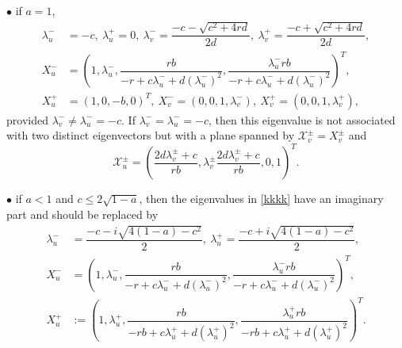 \documentclass[11pt,a4paper]{article}
\numberwithin{equation}{section}
\numberwithin{figure}{section}
\begin{document}
\noindent $\bullet$ if $a=1$,
\begin{equation*}
\begin{aligned}
    \lambda_{u}^{-}&= -c,\ \lambda_{u}^{+}=0,\  \lambda_{v}^{-}= \dfrac{-c-\sqrt{c^2+4rd}}{2d},\ \lambda_{v}^{+}= \dfrac{-c+\sqrt{c^2+4rd}}{2d},\\
    X^{-}_{u}&=\left(1, \lambda_{u}^{-}, \dfrac{rb}{-r+c\lambda_{u}^{-}+d(\lambda_{u}^{-})^2}, \dfrac{\lambda_{u}^{-}rb}{-r+c\lambda_{u}^{-}+d(\lambda_{u}^{-})^2}\right)^T,   \\
     X^{+}_{u}&= \left(1, 0, -b, 0\right)^T,\ X^{-}_{v}=\left(0, 0, 1, \lambda_{v}^-\right), \  X^{+}_{v}=\left( 0, 0, 1, \lambda_{v}^+\right),
\end{aligned}
\end{equation*}
provided $\lambda_{v}^{-}\neq \lambda_{u}^{-}=-c$. If $\lambda_{v}^{-}=\lambda_{u}^{-}=-c$, then this eigenvalue is not associated with two distinct eigenvectors but with a plane spanned by $\mathcal{X}_{v}^{\pm}=X_{v}^{\pm}$ and 
\begin{equation}\label{eq:Xupm+infty}
    \mathcal{X}_{u}^{\pm} = \left(\frac{2d\lambda_{v}^{\pm}+c}{rb}, \lambda_{v}^{\pm}\frac{2d\lambda_{v}^{\pm}+c}{rb}, 0, 1\right)^T.
\end{equation}

\noindent $\bullet$ if  $a<1$ and $c\leq 2\sqrt{1-a}$, then the eigenvalues in \eqref{kkkk}  have an imaginary part and  should be replaced by 
\begin{equation*}
\begin{aligned}
    \lambda_{u}^{-}&= \dfrac{-c-i\sqrt{4(1-a)-c^2}}{2},\ \lambda_{u}^{+}=\dfrac{-c+i\sqrt{4(1-a)-c^2}}{2},\\
    X^{-}_{u}&=\left(1, \lambda_{u}^{-},\dfrac{rb}{-r+c\lambda_{u}^{-}+d(\lambda_{u}^{-})^2}, \dfrac{\lambda_{u}^{-}rb}{-r+c\lambda_{u}^{-}+d(\lambda_{u}^{-})^2}\right)^T,   \\
    X^{+}_{u}&:=\left(1, \lambda_{u}^{+}, \dfrac{rb}{-rb+c\lambda_{u}^{+}+d(\lambda_{u}^{+})^2}, \dfrac{\lambda_{u}^{+}rb}{-rb+c\lambda_{u}^{+}+d(\lambda_{u}^{+})^2}\right)^T.
\end{aligned} 
\end{equation*}
\medskip
\end{document}
